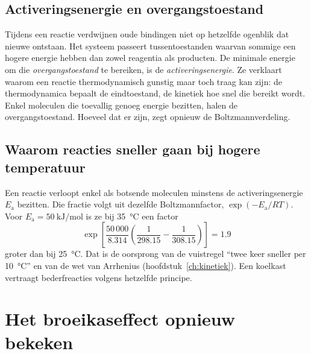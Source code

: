 \subsection{Activeringsenergie en overgangstoestand}
\label{sec:activeringsenergie-kwantum}

Tijdens een reactie verdwijnen oude bindingen niet op hetzelfde ogenblik dat nieuwe ontstaan. Het systeem passeert tussentoestanden waarvan sommige een hogere energie hebben dan zowel reagentia als producten. De minimale energie om die \emph{overgangstoestand} te bereiken, is de \emph{activeringsenergie}. Ze verklaart waarom een reactie thermodynamisch gunstig maar toch traag kan zijn: de thermodynamica bepaalt de eindtoestand, de kinetiek hoe snel die bereikt wordt. Enkel moleculen die toevallig genoeg energie bezitten, halen de overgangstoestand. Hoeveel dat er zijn, zegt opnieuw de Boltzmannverdeling.

\subsection{Waarom reacties sneller gaan bij hogere temperatuur}

Een reactie verloopt enkel als botsende moleculen minstens de activeringsenergie $E_\mathrm{a}$ bezitten. Die fractie volgt uit dezelfde Boltzmannfactor, $\exp(-E_\mathrm{a}/RT)$. Voor $E_\mathrm{a} = \SI{50}{\kilo\joule\per\mole}$ is ze bij \SI{35}{\celsius} een factor
\[
\exp\!\left[\frac{50\,000}{8.314}\left(\frac{1}{298.15} - \frac{1}{308.15}\right)\right] = 1.9
\]
groter dan bij \SI{25}{\celsius}. Dat is de oorsprong van de vuistregel ``twee keer sneller per \SI{10}{\celsius}'' en van de wet van Arrhenius (hoofdstuk~\ref{ch:kinetiek}). Een koelkast vertraagt bederfreacties volgens hetzelfde principe.

\section{Het broeikaseffect opnieuw bekeken}

